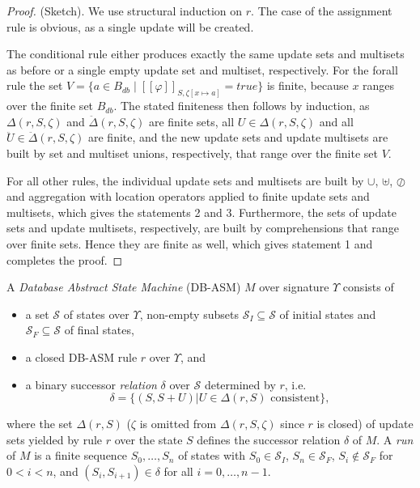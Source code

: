 \documentclass[preprint,11pt]{elsarticle}
\theoremstyle{definition}
\theoremstyle{remark}
\begin{document}
\begin{proof}(Sketch). We use structural induction on $r$. The case of the assignment rule is obvious, as a single update will be created.

The conditional rule either produces exactly the same update sets and multisets as before or a single empty update set and multiset, respectively. For the forall rule the set $V = \{ a \in B_{db}\mid [\![\varphi]\!]_{S,\zeta[x \mapsto a]} = \mathit{true} \}$ is finite, because $x$ ranges over the finite set $B_{db}$. The stated finiteness then follows by induction, as $\Delta(r,S,\zeta)$ and $\ddot{\Delta}(r,S,\zeta)$ are finite sets, all $U \in \Delta(r,S,\zeta)$ and all $\ddot{U} \in \ddot{\Delta}(r,S,\zeta)$ are finite, and the new update sets and update multisets are built by set and multiset unions, respectively, that range over the finite set $V$.

For all other rules, the individual update sets and multisets are built by $\cup$, $\uplus$, $\oslash$ and aggregation with location operators applied to finite update sets and multisets, which gives the statements 2 and 3. Furthermore, the sets of update sets and update multisets, respectively, are built by comprehensions that range over finite sets. Hence they are finite as well, which gives statement 1 and completes the proof.

\end{proof}


A {\em Database Abstract State Machine} (DB-ASM) $M$ over signature
$\Upsilon$ consists of

\begin{itemize}

\item a set $\mathcal{S}$ of states over $\Upsilon$, non-empty subsets $\mathcal{S}_I \subseteq \mathcal{S}$ of initial states and $\mathcal{S}_F \subseteq \mathcal{S}$ of final states,

\item a closed DB-ASM rule $r$ over $\Upsilon$, and

\item a binary successor \emph{relation} $\delta$ over $\mathcal{S}$ determined by $r$, i.e.
\[ \delta=\{(S,S+U)|U\in \Delta(r,S) \text{ consistent} \} , \]


\end{itemize}
where the set $\Delta(r,S)$ ($\zeta$ is omitted from
$\Delta(r,S,\zeta)$ since $r$ is closed) of update sets yielded by
rule $r$ over the state $S$ defines the successor relation $\delta$ of $M$. A {\em
run} of $M$ is a finite sequence $S_0 ,\dots, S_n$ of states with
$S_0 \in \mathcal{S}_I$, $S_n \in \mathcal{S}_F$, $S_i \notin
\mathcal{S}_F$ for $0 < i < n$, and $(S_i,S_{i+1}) \in \delta$ for
all $i=0,\dots,n-1$.
\end{document}
